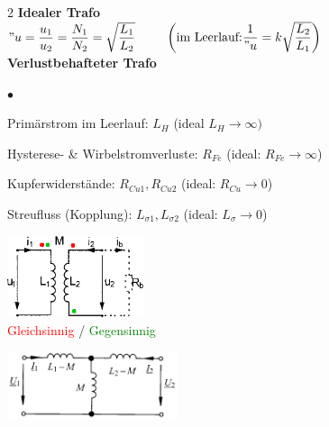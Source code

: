 \begin{multicols}{2}
	  	\textbf{Idealer Trafo}\\ 
	  	$"u = \dfrac{u_1}{u_2} = \dfrac{N_1}{N_2} = \sqrt{\dfrac{L_1}{L_2}} \qquad $ $\left( \text{im Leerlauf:} \dfrac{1}{"u} = k \sqrt{\dfrac{L_2}{L_1}}\right) $\\

  		\textbf{Verlustbehafteter Trafo}
  		\begin{list}{$\bullet$}{\setlength{\itemsep}{0cm} \setlength{\parsep}{0cm} \setlength{\topsep}{0cm}} 
          \item Prim\"arstrom im Leerlauf: $L_H$
          	(ideal $L_H \rightarrow \infty)$
          \item Hysterese- \& Wirbelstromverluste: $R_{Fe}$ \newline
          	(ideal: $R_{Fe}\rightarrow \infty$) 
          \item Kupferwiderst\"ande: $R_{Cu1}, R_{Cu2}$
          	(ideal: $R_{Cu}
          \rightarrow 0$)
          \item Streufluss (Kopplung): $L_{\sigma1}, L_{\sigma2}$
          	(ideal: $L_{\sigma} \rightarrow 0$)
        \end{list}

	\columnbreak
  		\begin{flushleft}
  		\includegraphics[width=4cm]{bilder/trafo-kopplung.png} \\
  		\small{\textcolor{red}{Gleichsinnig} / \textcolor{green}{Gegensinnig}} \\
  		\vspace{1.5cm}

	  	\includegraphics[width=5cm]{bilder/T_Ersatzschaltbild_VST.png}\\
		\end{flushleft}  	
	
\end{multicols}
\renewcommand{\arraystretch}{1}